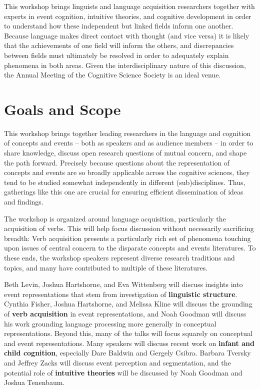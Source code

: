 \documentclass[10pt,letterpaper]{article}
\begin{document}
This workshop brings linguists and language acquisition researchers
together with experts in event cognition, intuitive theories, and
cognitive development in order to understand how
these independent but linked fields inform one
another. Because language makes direct contact with thought (and vice versa) it is likely that the achievements of one
field will inform the others, and discrepancies between fields must
ultimately be resolved in order to adequately explain phenomena in both areas. Given
the interdisciplinary nature of this discussion, the Annual
Meeting of the Cognitive Science Society is an ideal venue.

\section{Goals and Scope}

This workshop brings together leading researchers in the language and
cognition of concepts and events -- both as speakers and as audience
members -- in order to share knowledge, discuss open research
questions of mutual concern, and shape the path forward. Precisely
because questions about the representation of concepts and events are
so broadly applicable across the cognitive sciences, they tend to be
studied somewhat independently in different (sub)disciplines. Thus,
gatherings like this one are crucial for ensuring efficient
dissemination of ideas and findings.

The workshop is organized around language acquisition, particularly
the acquisition of verbs. This will help focus discussion without
necessarily sacrificing breadth: Verb acquisition presents a
particularly rich set of phenomena touching upon issues of central
concern to the disparate concepts and events literatures. To these ends, the workshop speakers represent diverse research
traditions and topics, and many have contributed to multiple of these literatures.

Beth Levin, Joshua Hartshorne, and Eva Wittenberg will discuss insights into event
representations that stem from investigation of \textbf{linguistic structure}. Cynthia Fisher, Joshua Hartshorne, and
Melissa Kline will discuss the grounding of \textbf{verb acquisition} in event representations, and Noah Goodman
will discuss his work grounding language processing more generally in
conceptual representations. Beyond this, many of the talks will focus squarely on {conceptual and event representations}. Many speakers
will discuss recent work on \textbf{infant and child cognition}, especially Dare Baldwin and
Gergely Csibra. Barbara Tversky and Jeffrey Zacks will discuss event
perception and segmentation, and the potential role of
\textbf{intuitive theories} will be discussed by Noah Goodman and
Joshua Tenenbaum.
\end{document}
